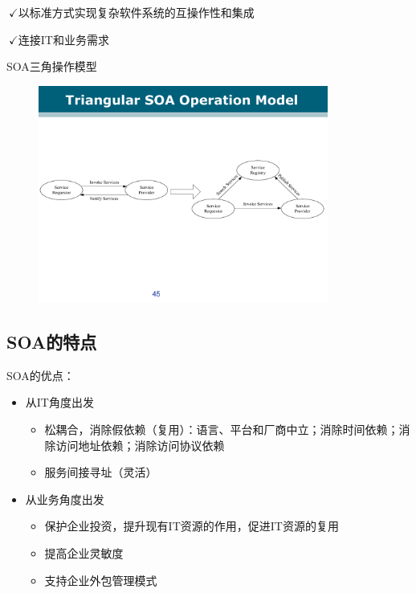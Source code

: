 $\ \checkmark$以标准方式实现复杂软件系统的互操作性和集成

$\ \checkmark$连接IT和业务需求

SOA三角操作模型
\begin{figure}[H]
    \vspace{-0.5em}
	\centering
	\includegraphics[width=0.85\textwidth]{images/SOA三角操作模型.pdf}
    \vspace{-1em}
\end{figure}

\subsection{SOA的特点}
SOA的优点：
\begin{itemize}
    \item 从IT角度出发
    \begin{itemize}
        \item 松耦合，消除假依赖（复用）：语言、平台和厂商中立；消除时间依赖；消除访问地址依赖；消除访问协议依赖
        \item 服务间接寻址（灵活）
    \end{itemize}
    \item 从业务角度出发
    \vspace{-0.8em}
    \begin{multicols}{2}
        \begin{itemize}
            \item 保护企业投资，提升现有IT资源的作用，促进IT资源的复用
            \item 提高企业灵敏度
            \item 支持企业外包管理模式
        \end{itemize}
    \end{multicols}
    \vspace{-1em}
\end{itemize}

